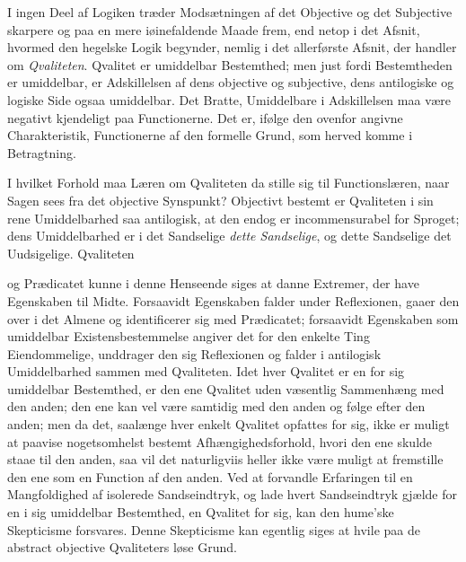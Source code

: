 \documentclass[12pt]{book}
\newcommand{\opage}[1]{\marginnote{\footnotesize\textit{[#1]}}}
\begin{document}
\opage{288} I ingen Deel af Logiken træder Modsætningen af det Objective og det Subjective skarpere og paa en mere
iøinefaldende Maade frem, end netop i det Afsnit, hvormed den hegelske Logik begynder, nemlig i det
allerførste Afsnit, der handler om \emph{Qvaliteten}. Qvalitet er umiddelbar Bestemthed; men just fordi
Bestemtheden er umiddelbar, er Adskillelsen af dens objective og subjective, dens antilogiske og
logiske Side ogsaa umiddelbar. Det Bratte, Umiddelbare i Adskillelsen maa være negativt kjendeligt paa
Functionerne. Det er, ifølge den ovenfor angivne Charakteristik, Functionerne af den formelle Grund,
som herved komme i Betragtning.

I hvilket Forhold maa Læren om Qvaliteten da stille sig til Functionslæren, naar Sagen sees fra det
objective Synspunkt? Objectivt bestemt er Qvaliteten i sin rene Umiddelbarhed saa antilogisk, at den
endog er incommensurabel for Sproget; dens Umiddelbarhed er i det Sandselige \emph{dette Sandselige},
og dette Sandselige det Uudsigelige. Qvaliteten

\opage{289} og Prædicatet kunne i denne Henseende siges at danne Extremer, der have Egenskaben til Midte.
Forsaavidt Egenskaben falder under Reflexionen, gaaer den over i det Almene og identificerer sig med
Prædicatet; forsaavidt Egenskaben som umiddelbar Existensbestemmelse angiver det for den enkelte Ting
Eiendommelige, unddrager den sig Reflexionen og falder i antilogisk Umiddelbarhed sammen med
Qvaliteten. Idet hver Qvalitet er en for sig umiddelbar Bestemthed, er den ene Qvalitet uden væsentlig
Sammenhæng med den anden; den ene kan vel være samtidig med den anden og følge efter den anden; men da
det, saalænge hver enkelt Qvalitet opfattes for sig, ikke er muligt at paavise nogetsomhelst bestemt
Afhængighedsforhold, hvori den ene skulde staae til den anden, saa vil det naturligviis heller ikke
være muligt at fremstille den ene som en Function af den anden. Ved at forvandle Erfaringen til en
Mangfoldighed af isolerede Sandseindtryk, og lade hvert Sandseindtryk gjælde for en i sig umiddelbar
Bestemthed, en Qvalitet for sig, kan den hume'ske Skepticisme forsvares. Denne Skepticisme kan egentlig
siges at hvile paa de abstract objective Qvaliteters løse Grund.
\end{document}
